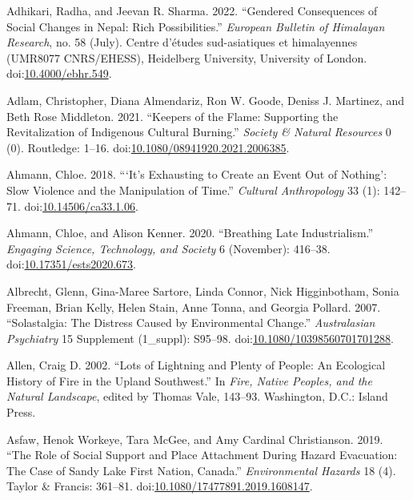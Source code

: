 \documentclass[
]{article}
\newlength{\cslhangindent}
\newenvironment{CSLReferences}[2] %
 {\begin{list}{}{%
  \setlength{\itemindent}{0pt}
  \setlength{\leftmargin}{0pt}
  \setlength{\parsep}{0pt}
  \ifodd #1
   \setlength{\leftmargin}{\cslhangindent}
   \setlength{\itemindent}{-1\cslhangindent}
  \fi
  \setlength{\itemsep}{#2\baselineskip}}}
 {\end{list}}
\begin{document}
\begin{CSLReferences}{1}{0}
Adhikari, Radha, and Jeevan R. Sharma. 2022. {``Gendered Consequences of Social Changes in {Nepal}: Rich Possibilities.''} \emph{European Bulletin of Himalayan Research}, no. 58 (July). Centre d'{é}tudes sud-asiatiques et himalayennes (UMR8077 CNRS/EHESS), Heidelberg University, University of London. doi:\href{https://doi.org/10.4000/ebhr.549}{10.4000/ebhr.549}.

Adlam, Christopher, Diana Almendariz, Ron W. Goode, Deniss J. Martinez, and Beth Rose Middleton. 2021. {``Keepers of the {Flame}: {Supporting} the {Revitalization} of {Indigenous Cultural Burning}.''} \emph{Society \& Natural Resources} 0 (0). Routledge: 1--16. doi:\href{https://doi.org/10.1080/08941920.2021.2006385}{10.1080/08941920.2021.2006385}.

Ahmann, Chloe. 2018. {``{`{It}'s Exhausting to Create an Event Out of Nothing'}: {Slow Violence} and the {Manipulation} of {Time}.''} \emph{Cultural Anthropology} 33 (1): 142--71. doi:\href{https://doi.org/10.14506/ca33.1.06}{10.14506/ca33.1.06}.

Ahmann, Chloe, and Alison Kenner. 2020. {``Breathing {Late Industrialism}.''} \emph{Engaging Science, Technology, and Society} 6 (November): 416--38. doi:\href{https://doi.org/10.17351/ests2020.673}{10.17351/ests2020.673}.

Albrecht, Glenn, Gina-Maree Sartore, Linda Connor, Nick Higginbotham, Sonia Freeman, Brian Kelly, Helen Stain, Anne Tonna, and Georgia Pollard. 2007. {``Solastalgia: {The Distress Caused} by {Environmental Change}.''} \emph{Australasian Psychiatry} 15 Supplement (1\_suppl): S95--98. doi:\href{https://doi.org/10.1080/10398560701701288}{10.1080/10398560701701288}.

Allen, Craig D. 2002. {``Lots of {Lightning} and {Plenty} of {People}: {An Ecological History} of {Fire} in the {Upland Southwest}.''} In \emph{Fire, {Native Peoples}, and the {Natural Landscape}}, edited by Thomas Vale, 143--93. Washington, D.C.: Island Press.

Asfaw, Henok Workeye, Tara McGee, and Amy Cardinal Christianson. 2019. {``The Role of Social Support and Place Attachment During Hazard Evacuation: The Case of {Sandy Lake First Nation}, {Canada}.''} \emph{Environmental Hazards} 18 (4). Taylor \& Francis: 361--81. doi:\href{https://doi.org/10.1080/17477891.2019.1608147}{10.1080/17477891.2019.1608147}.


\end{CSLReferences}
\end{document}
